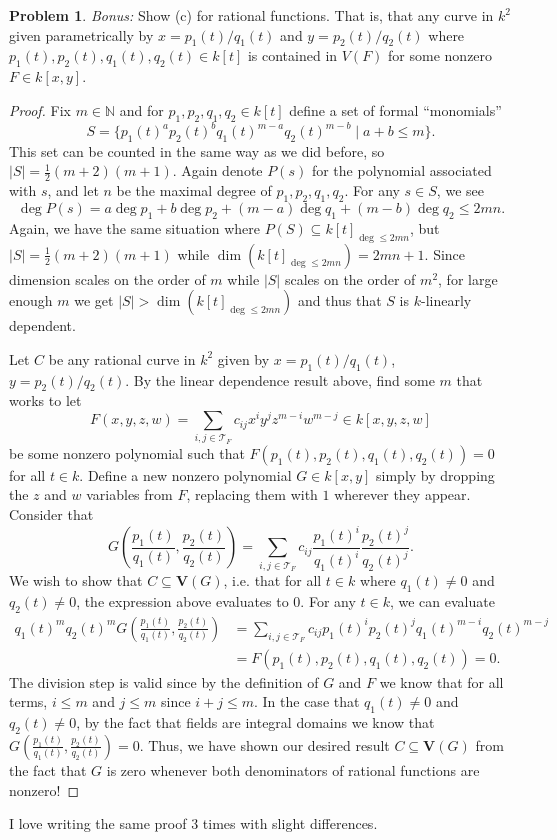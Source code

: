 \documentclass[12pt]{amsart}
\theoremstyle{definition}
\newtheorem{prob}{Problem}
\begin{document}
\begin{flushleft}
\begin{prob}
\emph{Bonus:} Show (c) for rational functions. That is, that any curve in $k^2$ given parametrically by $x=p_1(t)/q_1(t)$ and $y = p_2(t)/q_2(t)$ where $p_1(t), p_2(t), q_1(t), q_2(t)\in k[t]$
is contained in $V(F)$ for some nonzero $F\in k[x,y]$. 
\begin{proof}
    Fix $m \in \mathbb N$ and for $p_1,p_2,q_1,q_2 \in k[t]$ define a set of formal ``monomials''
    \[S = \{ p_1(t)^a p_2(t)^bq_1(t)^{m-a}q_2(t)^{m-b}\mid a+b \le m\}.\]
    This set can be counted in the same way as we did before, so $|S| = \frac{1}{2}(m+2)(m+1)$. Again denote $P(s)$ for the polynomial associated with $s$, and let $n$ be the maximal degree of $p_1,p_2,q_1,q_2$. For any $s \in S$, we see
    \[
    \deg P(s) = a\deg p_1 + b \deg p_2 + (m-a)\deg q_1+(m-b)\deg q_2 \le 2mn.
    \]
    Again, we have the same situation where $P(S) \subseteq k[t]_{\deg \le 2mn}$, but $|S| = \frac{1}{2}(m+2)(m+1)$ while $\dim(k[t]_{\deg\le 2mn}) = 2mn+1$. Since dimension scales on the order of $m$ while $|S|$ scales on the order of $m^2$, for large enough $m$ we get $|S| > \dim (k[t]_{\deg \le 2mn})$ and thus that $S$ is $k$-linearly dependent.

    Let $C$ be any rational curve in $k^2$ given by $x=p_1(t)/q_1(t)$, $y=p_2(t)/q_2(t)$. By the linear dependence result above, find some $m$ that works to let \[F(x,y,z,w) = \sum_{i,j\in \mathcal T_F} c_{ij} x^i y^jz^{m-i}w^{m-j} \in k[x,y,z,w]\] be some nonzero polynomial such that $F(p_1(t),p_2(t),q_1(t),q_2(t))=0$ for all $t \in k$. Define a new nonzero polynomial $G \in k[x,y]$ simply by dropping the $z$ and $w$ variables from $F$, replacing them with $1$ wherever they appear. Consider that
    \[
    G\left(\frac{p_1(t)}{q_1(t)}, \frac{p_2(t)}{q_2(t)}\right) = \sum_{i,j\in \mathcal T_F} c_{ij} \frac{p_1(t)^i}{q_1(t)^i}\frac{p_2(t)^j}{q_2(t)^j}.
    \]
    We wish to show that $C \subseteq \mathbf V(G)$, i.e. that for all $t \in k$ where $q_1(t)\ne 0$ and $q_2(t)\ne 0$, the expression above evaluates to 0. For any $t \in k$, we can evaluate
    \begin{align*}
        q_1(t)^m q_2(t)^m G\left(\frac{p_1(t)}{q_1(t)},\frac{p_2(t)}{q_2(t)} \right) &= \sum_{i,j\in\mathcal T_F} c_{ij} p_1(t)^i p_2(t)^j q_1(t)^{m-i}q_2(t)^{m-j} \\
        &= F(p_1(t),p_2(t),q_1(t),q_2(t))=0.
    \end{align*}
    The division step is valid since by the definition of $G$ and $F$ we know that for all terms, $i \le m$ and $j \le m$ since $i + j \le m$. In the case that $q_1(t) \ne 0$ and $q_2(t) \ne 0$, by the fact that fields are integral domains we know that $G\left(\frac{p_1(t)}{q_1(t)},\frac{p_2(t)}{q_2(t)}\right) = 0$. Thus, we have shown our desired result $C \subseteq \mathbf V(G)$ from the fact that $G$ is zero whenever both denominators of rational functions are nonzero!
\end{proof}
\end{prob}
\bigskip 

I love writing the same proof 3 times with slight differences.


\end{flushleft}
\end{document}
